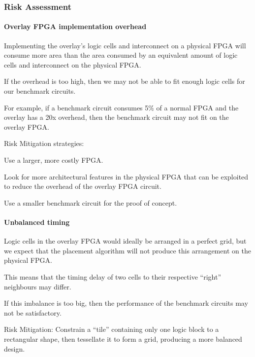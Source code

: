 \subsubsection{Risk Assessment}

\paragraph{Overlay FPGA implementation overhead}
\label{risk-size}

\begin{itemlist}
	\item Implementing the overlay's logic cells and interconnect on a physical FPGA will consume more area than the area consumed by an equivalent amount of logic cells and interconnect on the physical FPGA.
	\item If the overhead is too high, then we may not be able to fit enough logic cells for our benchmark circuits.
	\item For example, if a benchmark circuit consumes 5\% of a normal FPGA and the overlay has a 20x overhead, then the benchmark circuit may not fit on the overlay FPGA.
	\item Risk Mitigation strategies: \
		\begin{itemlist}
			\item Use a larger, more costly FPGA.
			\item Look for more architectural features in the physical FPGA that can be exploited to reduce the overhead of the overlay FPGA circuit.
			\item Use a smaller benchmark circuit for the proof of concept.
		\end{itemlist}
\end{itemlist}

\paragraph{Unbalanced timing}

\begin{itemlist}
	\item Logic cells in the overlay FPGA would ideally be arranged in a perfect grid, but we expect that the placement algorithm will not produce this arrangement on the physical FPGA.
	\item This means that the timing delay of two cells to their respective ``right'' neighbours may differ.
	\item If this imbalance is too big, then the performance of the benchmark circuits may not be satisfactory.
	\item Risk Mitigation: Constrain a ``tile'' containing only one logic block to a rectangular shape, then tessellate it to form a grid, producing a more balanced design.
\end{itemlist}

